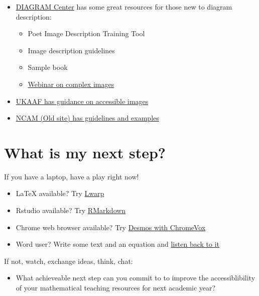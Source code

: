 \documentclass[
  12pt,
  a4paper]{extarticle}
\providecommand{\tightlist}{%
  \setlength{\itemsep}{0pt}\setlength{\parskip}{0pt}}
\theoremstyle{plain}
\theoremstyle{plain}
\theoremstyle{plain}
\theoremstyle{plain}
\theoremstyle{plain}
\theoremstyle{definition}
\theoremstyle{definition}
\theoremstyle{definition}
\theoremstyle{remark}
\renewcommand{\;}{\,}
\begin{document}
\begin{itemize}
\tightlist
\item
  \href{http://diagramcenter.org/}{DIAGRAM Center} has some great resources for those new to diagram description:

  \begin{itemize}
  \tightlist
  \item
    Poet Image Description Training Tool
  \item
    Image description guidelines
  \item
    Sample book
  \item
    \href{http://diagramcenter.org/diagramwebinars.html\#compleximages}{Webinar on complex images}
  \end{itemize}
\item
  \href{https://www.ukaaf.org/standards/\#accessible-images}{UKAAF has guidance on accessible images}
\item
  \href{http://ncamftp.wgbh.org/ncam-old-site/experience_learn/educational_media/stemdx.html}{NCAM (Old site) has guidelines and examples}
\end{itemize}

\hypertarget{what-is-my-next-step}{%
\section{What is my next step?}\label{what-is-my-next-step}}

If you have a laptop, have a play right now!

\begin{itemize}
\tightlist
\item
  LaTeX available? Try \href{LINK}{Lwarp}
\item
  Rstudio available? Try \href{https://stem-enable.github.io/RMarkdownWorkshop/}{RMarkdown}
\item
  Chrome web browser available? Try \href{https://people.bath.ac.uk/cspehj/coventry/arclengthInR.html}{Desmos with ChromeVox}
\item
  Word user? Write some text and an equation and \href{https://stem-enable.github.io/WordWorkshop/immersive.html}{listen back to it}
\end{itemize}

If not, watch, exchange ideas, think, chat:

\begin{itemize}
\tightlist
\item
  What achieveable next step can you commit to to improve the accessiblibility of your mathematical teaching resources for next academic year?
\end{itemize}
\end{document}
